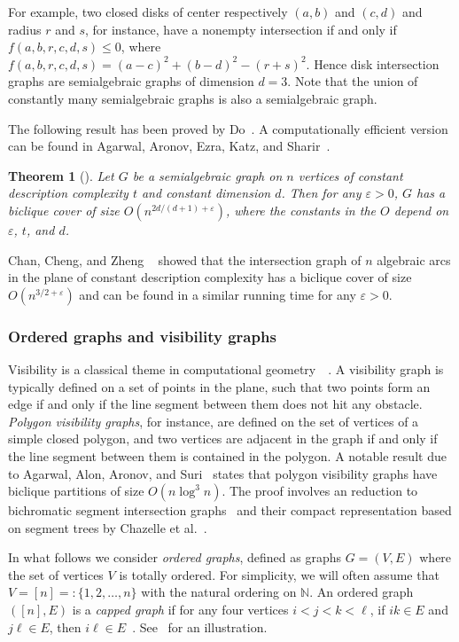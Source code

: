 \documentclass{amsart}
\newtheorem{theorem}{Theorem}%
\newcommand{\darkblue}{\color{darkblue}} %
\newcommand{\defn}[1]{\textsl{\darkblue #1}} %
\begin{document}
For example, two closed disks of center respectively $(a,b)$ and $(c,d)$ and radius $r$ and $s$, for instance, have a nonempty intersection if and only if $f(a,b,r,c,d,s)\leq 0$, where $f(a,b,r,c,d,s)=(a-c)^2+(b-d)^2-(r+s)^2$. Hence disk intersection graphs are semialgebraic graphs of dimension $d=3$. Note that the union of constantly many semialgebraic graphs is also a semialgebraic graph. 

The following result has been proved by Do~\cite{MR4013919}. 
A computationally efficient version can be found in Agarwal, Aronov, Ezra, Katz, and Sharir~\cite[Corollary A.5]{AAEKS25}.
\begin{theorem}[\cite{MR4013919,AAEKS25}]
Let $G$ be a semialgebraic graph on $n$ vertices of constant description complexity $t$ and constant dimension $d$.
Then for any $\varepsilon > 0$, $G$ has a biclique cover of size
$O(n^{2d/(d+1) + \varepsilon})$, where the constants in the $O$ depend on $\varepsilon$, $t$, and $d$.
\end{theorem}

Chan, Cheng, and Zheng ~\cite[Final Remarks]{CCZ24} showed that the intersection graph of $n$ algebraic arcs in the plane of constant description complexity has a biclique cover of size $O(n^{3/2+\varepsilon})$ and can be found in a similar running time for any $\varepsilon>0$. 

\subsubsection{Ordered graphs and visibility graphs}

Visibility is a classical theme in computational geometry~\cite[Chapter 15]{CGbook}~\cite{G07,OR17}.
A visibility graph is typically defined on a set of points in the plane, such that two points form an edge if and only if the line segment between them does not hit any obstacle.
\defn{Polygon visibility graphs}, for instance, are defined on the set of vertices of a simple closed polygon, and two vertices are adjacent in the graph if and only if the line segment between them is contained in the polygon.
A notable result due to Agarwal, Alon, Aronov, and Suri~\cite{MR1298916} states that polygon visibility graphs have biclique partitions of size $O(n\log^3 n)$.
The proof involves an reduction to bichromatic segment intersection graphs~\cite{CG89} and their compact representation based on segment trees by Chazelle et al.~\cite{CEGS94}.

In what follows we consider \defn{ordered graphs}, defined as graphs $G=(V,E)$ where the set of vertices $V$ is totally ordered. 
For simplicity, we will often assume that $V = [n] =: \{1, 2, \ldots , n\}$ with the natural ordering on $\mathbb{N}$.
An ordered graph $([n], E)$ is a \defn{capped graph} if for any four vertices $i<j<k<\ell$, if $ik\in E$ and $j\ell\in E$, then $i\ell\in E$~\cite{MR4562782}. 
See~ for an illustration. 
\end{document}
